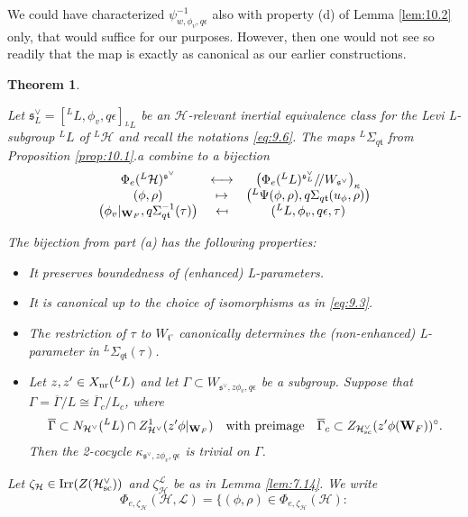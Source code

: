 \documentclass[11pt]{amsart}
\newtheorem{thm}{Theorem}[section]
\theoremstyle{definition}
\newcommand{\enuma}[1]{\begin{enumerate}[\textup{(}a\textup{)}] {#1} \end{enumerate}}
\newcommand{\mb}{\mathbf}
\newcommand{\q}{/\!/}
\def\Irr{{\rm Irr}}
\def\cL{{\mathcal L}}
\def\cH{{\mathcal H}}
\def\nr{{\rm nr}}
\def\fs{{\mathfrak s}}
\def\ft{{\mathfrak t}}
\def\sc{{\rm sc}}
\begin{document}
We could have characterized $\psi_{w,\phi_v,q \epsilon}^{-1}$ also with property
(d) of Lemma \ref{lem:10.2} only, that would suffice for our purposes. 
However, then one would not see so readily that the map is exactly as canonical as 
our earlier constructions.

\begin{thm}\label{thm:10.3}
\enuma{
\item Let $\fs^\vee_L = [{}^L L,\phi_v, q  \epsilon]_{{}^L L}$ be an $\cH$-relevant 
inertial equivalence class for the Levi L-subgroup ${}^L L$ of ${}^L \cH$ and recall
the notations \eqref{eq:9.6}. The maps ${}^L \Sigma_{q \ft}$ from Proposition 
\ref{prop:10.1}.a combine to a bijection
\[
\begin{array}{ccc}
\Phi_e ({}^L \cH )^{\fs^\vee} & \longleftrightarrow & 
\big( \Phi_e ({}^L L)^{\fs^\vee_L} \q W_{\fs^\vee} \big)_\kappa \\
(\phi,\rho) & \mapsto & \big( {}^L \Psi (\phi,\rho), q\Sigma_{q \ft}(u_\phi,\rho) \big) \\
\big( \phi_v |_{\mb W_F}, q \Sigma_{q \ft}^{-1}(\tau) \big) & \reflectbox{$\mapsto$} & 
({}^L L, \phi_v, q \epsilon, \tau)
\end{array}
\]
\item The bijection from part (a) has the following properties:
\begin{itemize}
\item It preserves boundedness of (enhanced) L-parameters.
\item It is canonical up to the choice of isomorphisms as in \eqref{eq:9.3}.
\item The restriction of $\tau$ to $W_{\ft^\circ}$ canonically determines the 
(non-enhanced) L-parameter in ${}^L \Sigma_{q \ft}(\tau)$.
\item Let $z,z' \in X_\nr ({}^L L)$ and let $\Gamma \subset W_{\fs^\vee,z \phi_v,
q \epsilon}$ be a subgroup. Suppose that $\Gamma = \overline{\Gamma} / L \cong 
\overline{\Gamma}_c / L_c$, where 
\[
\overline{\Gamma} \subset N_{\cH^\vee}({}^L L) \cap Z^1_{\cH^\vee}(z' \phi |_{\mb W_F}) 
\quad \text{with preimage} \quad \overline{\Gamma}_c \subset
Z_{\cH^\vee_{\sc}}(z' \phi (\mb W_F))^\circ.
\]
Then the 2-cocycle $\kappa_{\fs^\vee,z \phi_v,q \epsilon}$ is trivial on $\Gamma$.
\end{itemize}
\item Let $\zeta_\cH \in \Irr (Z(\cH^\vee_\sc))$ and $\zeta_\cH^\cL$ be as in
Lemma \ref{lem:7.14}. We write
\[
\Phi_{e,\zeta_\cH} (\cH,\cL) = \{ (\phi,\rho) \in \Phi_{e,\zeta_\cH} (\cH) : 
\]}
\end{thm}
\end{document}
